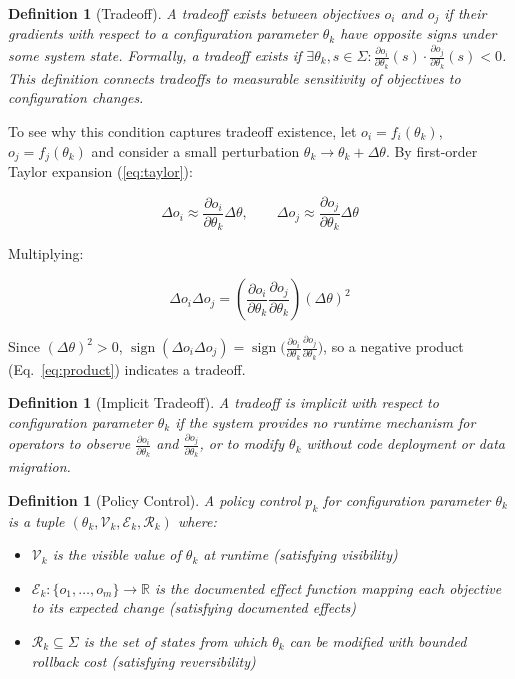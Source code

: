 \documentclass[conference]{IEEEtran}
\newtheorem{definition}[theorem]{Definition}
\begin{document}
\begin{definition}[Tradeoff]
A tradeoff exists between objectives $o_i$ and $o_j$ if their gradients with respect to a configuration parameter $\theta_k$ have opposite signs under some system state. Formally, a tradeoff exists if $\exists \theta_k, s \in \Sigma: \frac{\partial o_i}{\partial \theta_k}(s) \cdot \frac{\partial o_j}{\partial \theta_k}(s) < 0$.
This definition connects tradeoffs to measurable sensitivity of objectives to configuration changes.
\end{definition}


To see why this condition captures tradeoff existence, let $o_i = f_i(\theta_k)$, $o_j = f_j(\theta_k)$ and consider a small perturbation $\theta_k \to \theta_k + \Delta\theta$. By first-order Taylor expansion (\eqref{eq:taylor}):

\begin{equation}
\Delta o_i \approx \frac{\partial o_i}{\partial \theta_k} \Delta\theta, \qquad
\Delta o_j \approx \frac{\partial o_j}{\partial \theta_k} \Delta\theta
\label{eq:taylor}
\end{equation}

Multiplying:

\begin{equation}
\Delta o_i \Delta o_j = \left(\frac{\partial o_i}{\partial \theta_k} \frac{\partial o_j}{\partial \theta_k}\right) (\Delta\theta)^2
\label{eq:product}
\end{equation}

Since $(\Delta\theta)^2 > 0$, $\operatorname{sign}(\Delta o_i \Delta o_j) = \operatorname{sign}\bigl(\frac{\partial o_i}{\partial \theta_k} \frac{\partial o_j}{\partial \theta_k}\bigr)$, so a negative product (Eq.~\eqref{eq:product}) indicates a tradeoff.


\begin{definition}[Implicit Tradeoff]
A tradeoff is \textit{implicit} with respect to configuration parameter $\theta_k$ if the system provides no runtime mechanism for operators to observe $\frac{\partial o_i}{\partial \theta_k}$ and $\frac{\partial o_j}{\partial \theta_k}$, or to modify $\theta_k$ without code deployment or data migration.
\end{definition}


\begin{definition}[Policy Control]
A policy control $p_k$ for configuration parameter $\theta_k$ is a tuple $(\theta_k, \mathcal{V}_k, \mathcal{E}_k, \mathcal{R}_k)$ where:
\begin{itemize}
    \item $\mathcal{V}_k$ is the visible value of $\theta_k$ at runtime (satisfying visibility)
    \item $\mathcal{E}_k: \{o_1,\ldots,o_m\} \to \mathbb{R}$ is the documented effect function mapping each objective to its expected change (satisfying documented effects)
    \item $\mathcal{R}_k \subseteq \Sigma$ is the set of states from which $\theta_k$ can be modified with bounded rollback cost (satisfying reversibility)
\end{itemize}
\end{definition}
\end{document}
